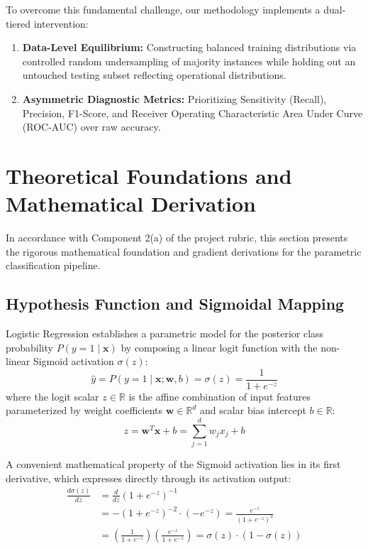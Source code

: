 \documentclass[11pt,a4paper]{article}
\begin{document}
To overcome this fundamental challenge, our methodology implements a dual-tiered intervention:
\begin{enumerate}
    \item \textbf{Data-Level Equilibrium:} Constructing balanced training distributions via controlled random undersampling of majority instances while holding out an untouched testing subset reflecting operational distributions.
    \item \textbf{Asymmetric Diagnostic Metrics:} Prioritizing Sensitivity (Recall), Precision, F1-Score, and Receiver Operating Characteristic Area Under Curve (ROC-AUC) over raw accuracy.
\end{enumerate}

\section{Theoretical Foundations and Mathematical Derivation}
\label{sec:theory}

In accordance with Component 2(a) of the project rubric, this section presents the rigorous mathematical foundation and gradient derivations for the parametric classification pipeline.

\subsection{Hypothesis Function and Sigmoidal Mapping}
Logistic Regression establishes a parametric model for the posterior class probability $P(y = 1 \mid \mathbf{x})$ by composing a linear logit function with the non-linear Sigmoid activation $\sigma(z)$:
\begin{equation}
    \hat{y} = P(y = 1 \mid \mathbf{x}; \mathbf{w}, b) = \sigma(z) = \frac{1}{1 + e^{-z}}
    \label{eq:sigmoid}
\end{equation}
where the logit scalar $z \in \mathbb{R}$ is the affine combination of input features parameterized by weight coefficients $\mathbf{w} \in \mathbb{R}^d$ and scalar bias intercept $b \in \mathbb{R}$:
\begin{equation}
    z = \mathbf{w}^T \mathbf{x} + b = \sum_{j=1}^d w_j x_j + b
\end{equation}

A convenient mathematical property of the Sigmoid activation lies in its first derivative, which expresses directly through its activation output:
\begin{align}
    \frac{d\sigma(z)}{dz} &= \frac{d}{dz} \left( 1 + e^{-z} \right)^{-1} \nonumber \\
    &= -(1 + e^{-z})^{-2} \cdot (-e^{-z}) = \frac{e^{-z}}{(1 + e^{-z})^2} \nonumber \\
    &= \left(\frac{1}{1 + e^{-z}}\right) \left(\frac{e^{-z}}{1 + e^{-z}}\right) = \sigma(z) \cdot \left(1 - \sigma(z)\right)
    \label{eq:sigmoid_deriv}
\end{align}
\end{document}
